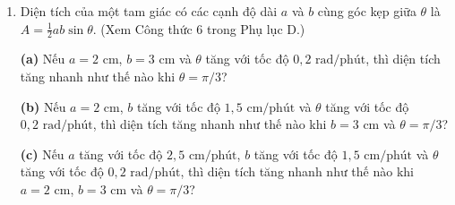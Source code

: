 \begin{minipage}[t]{0.482\textwidth}
\begin{enumerate}[label=\textbf{\arabic*.}, leftmargin=1.35em, itemsep=0.48em, topsep=0pt, parsep=0pt]
\item Diện tích của một tam giác có các cạnh độ dài $a$ và $b$ cùng góc kẹp giữa $\theta$ là $A = \frac{1}{2}ab\sin\theta$. (Xem Công thức 6 trong Phụ lục D.)
\par\smallskip
\textbf{(a)} Nếu $a = 2\text{ cm}$, $b = 3\text{ cm}$ và $\theta$ tăng với tốc độ $0{,}2\text{ rad/phút}$, thì diện tích tăng nhanh như thế nào khi $\theta = \pi/3$?
\par\smallskip
\textbf{(b)} Nếu $a = 2\text{ cm}$, $b$ tăng với tốc độ $1{,}5\text{ cm/phút}$ và $\theta$ tăng với tốc độ $0{,}2\text{ rad/phút}$, thì diện tích tăng nhanh như thế nào khi $b = 3\text{ cm}$ và $\theta = \pi/3$?
\par\smallskip
\textbf{(c)} Nếu $a$ tăng với tốc độ $2{,}5\text{ cm/phút}$, $b$ tăng với tốc độ $1{,}5\text{ cm/phút}$ và $\theta$ tăng với tốc độ $0{,}2\text{ rad/phút}$, thì diện tích tăng nhanh như thế nào khi $a = 2\text{ cm}$, $b = 3\text{ cm}$ và $\theta = \pi/3$?
\end{enumerate}
\end{minipage}\hfill
